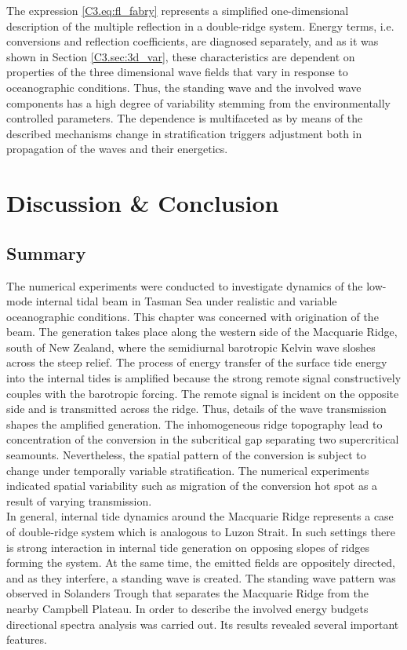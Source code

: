 \documentclass[12pt]{article}
\begin{document}
The expression \eqref{C3.eq:fl_fabry} represents a simplified one-dimensional description of the 
multiple reflection in a double-ridge system. Energy terms, i.e. conversions and reflection 
coefficients, are diagnosed separately, and as it was shown in Section \ref{C3.sec:3d_var},  
these characteristics are dependent on properties of the three dimensional wave fields 
that vary in response to oceanographic conditions. Thus, the standing wave and the involved 
wave components has a high degree of variability stemming from the environmentally controlled 
parameters. The dependence is multifaceted as by means of the described mechanisms change in 
stratification triggers adjustment both in propagation of the waves and their energetics.

\newpage

\section{Discussion \& Conclusion}
\subsection{Summary}
The numerical experiments were conducted to investigate dynamics of the low-mode internal tidal 
beam in Tasman Sea under realistic and variable oceanographic conditions. This chapter was concerned with 
origination of the beam. The generation takes place along the western side of the Macquarie Ridge, south of New Zealand, 
where the semidiurnal barotropic Kelvin wave sloshes across the steep relief. The process of energy 
transfer of the surface tide energy into the internal tides is amplified because the strong remote 
signal constructively couples with the barotropic forcing. The remote signal is incident on the 
opposite side and is transmitted across the ridge. Thus, details of the wave transmission shapes 
the 
amplified generation. The inhomogeneous ridge topography lead to concentration of the conversion in 
the subcritical gap separating two supercritical seamounts. Nevertheless, the spatial pattern of 
the conversion is subject to change under temporally variable stratification. The numerical 
experiments indicated spatial variability such as migration of the conversion hot spot as a 
result of varying transmission.\\

In general, internal tide dynamics around the Macquarie Ridge represents a case of double-ridge 
system which is analogous to Luzon Strait. In such settings there is strong interaction in internal 
tide generation on opposing slopes of ridges forming the system. At the same time, the emitted fields are oppositely directed, and as they interfere, a standing wave is created. The standing wave pattern was observed in Solanders 
Trough that separates the Macquarie Ridge from the nearby Campbell Plateau. In order to describe 
the involved energy budgets directional spectra analysis was carried out. Its results revealed 
several important features.\\
\end{document}
